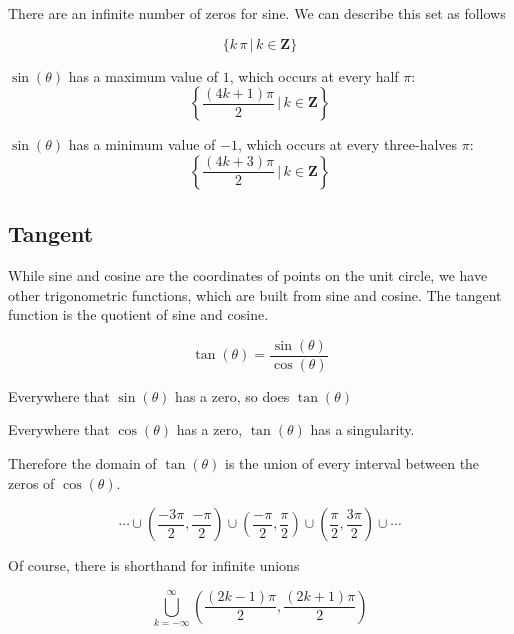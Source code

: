 \documentclass{ximera}
\begin{document}
There are an infinite number of zeros for sine.  We can describe this set as follows


\[  \{  k \, \pi   \, | \, k \in \textbf{Z}   \}      \]





$\sin(\theta)$ has a maximum value of $1$, which occurs at every half $\pi$:  
\[ \left\{  \frac{(4k+1)\pi}{2} \, | \, k \in \textbf{Z}\right\} \]



$\sin(\theta)$ has a minimum value of $-1$, which occurs at every three-halves $\pi$:  
\[ \left\{  \frac{(4k+3)\pi}{2} \, | \, k \in \textbf{Z}\right\} \]











\subsection*{Tangent}


While sine and cosine are the coordinates of points on the unit circle, we have other trigonometric functions, which are built from sine and cosine.  The tangent function is the quotient of sine and cosine.




\[ \tan(\theta) = \frac{\sin(\theta)}{\cos(\theta)} \]


Everywhere that $\sin(\theta)$ has a zero, so does $\tan(\theta)$

Everywhere that $\cos(\theta)$ has a zero, $\tan(\theta)$ has a singularity.


Therefore the domain of $\tan(\theta)$ is the union of every interval between the zeros of $\cos(\theta)$.


\[      \cdots   \cup  \left(\frac{-3\pi}{2}, \frac{-\pi}{2}\right) \cup \left(\frac{-\pi}{2}, \frac{\pi}{2}\right) \cup \left(\frac{\pi}{2} , \frac{3\pi}{2}\right) \cup \cdots              \]


Of course, there is shorthand for infinite unions







\[    \bigcup^\infty_{k=-\infty} \left(\frac{(2k-1)\pi}{2}, \frac{(2k+1)\pi}{2}\right)   \]
\end{document}
